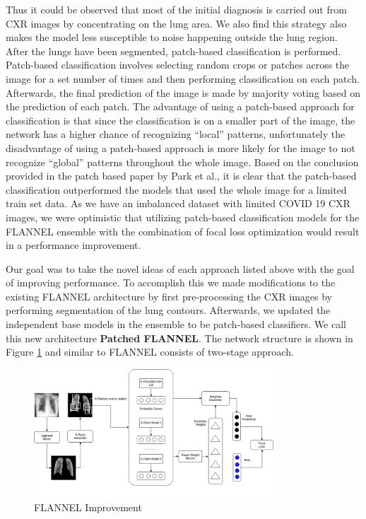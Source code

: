 \documentclass{sigkddExp}
\begin{document}
Thus it could be observed that most of the initial diagnosis is carried out from
CXR images by concentrating on the lung area. We also find this strategy also
makes the model less susceptible to noise happening outside the lung region.
After the lungs have been segmented, patch-based classification is performed.
Patch-based classification involves selecting random crops or patches across the
image for a set number of times and then performing classification on each
patch. Afterwards, the final prediction of the image is made by majority voting
based on the prediction of each patch. The advantage of using a patch-based
approach for classification is that since the classification is on a smaller
part of the image, the network has a higher chance of recognizing “local”
patterns, unfortunately the disadvantage of using a patch-based approach is more
likely for the image to not recognize “global” patterns throughout the whole
image. Based on the conclusion provided in the patch based paper
\cite{pmid32396075} by Park et al., it is clear that the patch-based
classification outperformed the models that used the whole image for a limited
train set data. As we have an imbalanced dataset with limited COVID 19 CXR
images, we were optimistic that utilizing patch-based classification models for
the FLANNEL ensemble with the combination of focal loss optimization would
result in a performance improvement.

Our goal was to take the novel ideas of each approach listed above with the goal
of improving performance. To accomplish this we made modifications to the
existing FLANNEL architecture by first pre-processing the CXR images by
performing segmentation of the lung contours. Afterwards, we updated the
independent base models in the ensemble to be patch-based classifiers. We call
this new architecture \textbf{Patched FLANNEL}. The network structure is shown in
Figure \ref{fig:improve} and similar to FLANNEL consists of two-stage approach.

\begin{figure}[h]
    \centering
    \includegraphics[width=0.8\textwidth]{../doc/images/Flannel_Improved_Latest.png}
    \caption{FLANNEL Improvement}
    \label{fig:improve}
\end{figure}
\end{document}

